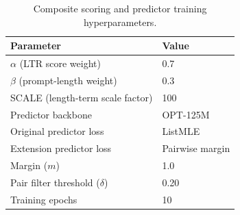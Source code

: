 \begin{table}[t]
    \centering
    \caption{Composite scoring and predictor training hyperparameters.}
    \label{tab:hyperparameters}
    \begin{tabular}{@{}ll@{}}
        \toprule
        Parameter & Value \\
        \midrule
        $\alpha$ (LTR score weight) & 0.7 \\
        $\beta$ (prompt-length weight) & 0.3 \\
        SCALE (length-term scale factor) & 100 \\
        Predictor backbone & OPT-125M \\
        Original predictor loss & ListMLE \\
        Extension predictor loss & Pairwise margin \\
        Margin ($m$) & 1.0 \\
        Pair filter threshold ($\delta$) & 0.20 \\
        Training epochs & 10 \\
        \bottomrule
    \end{tabular}
\end{table}
